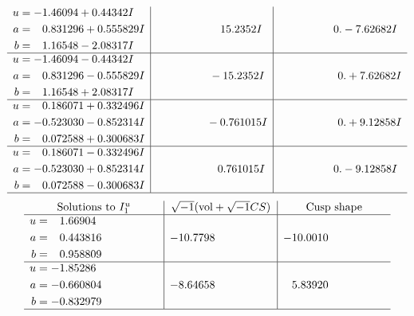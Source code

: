 \documentclass[1p]{elsarticle_modified}
\theoremstyle{definition}
\newcommand{\I}{\sqrt{-1}}
\begin{document}
$$\begin{array}{c|c|c}
\begin{aligned}
u &= -1.46094 + 0.44342 I \\
a &= \phantom{-}0.831296 + 0.555829 I \\
b &= \phantom{-}1.16548 - 2.08317 I\end{aligned}
 & \phantom{-0.000000 -}15.2352 I & \phantom{-0.000000 } 0. - 7.62682 I \\ \hline\begin{aligned}
u &= -1.46094 - 0.44342 I \\
a &= \phantom{-}0.831296 - 0.555829 I \\
b &= \phantom{-}1.16548 + 2.08317 I\end{aligned}
 & \phantom{-0.000000 } -15.2352 I & \phantom{-0.000000 -}0. + 7.62682 I \\ \hline\begin{aligned}
u &= \phantom{-}0.186071 + 0.332496 I \\
a &= -0.523030 - 0.852314 I \\
b &= \phantom{-}0.072588 + 0.300683 I\end{aligned}
 & \phantom{-0.000000 } -0.761015 I & \phantom{-0.000000 -}0. + 9.12858 I \\ \hline\begin{aligned}
u &= \phantom{-}0.186071 - 0.332496 I \\
a &= -0.523030 + 0.852314 I \\
b &= \phantom{-}0.072588 - 0.300683 I\end{aligned}
 & \phantom{-0.000000 -}0.761015 I & \phantom{-0.000000 } 0. - 9.12858 I\\
 \hline 
 \end{array}$$\newpage$$\begin{array}{c|c|c}  
\text{Solutions to }I^u_{1}& \I (\text{vol} + \sqrt{-1}CS) & \text{Cusp shape}\\
 \hline 
\begin{aligned}
u &= \phantom{-}1.66904\phantom{ +0.000000I} \\
a &= \phantom{-}0.443816\phantom{ +0.000000I} \\
b &= \phantom{-}0.958809\phantom{ +0.000000I}\end{aligned}
 & -10.7798\phantom{ +0.000000I} & -10.0010\phantom{ +0.000000I} \\ \hline\begin{aligned}
u &= -1.85286\phantom{ +0.000000I} \\
a &= -0.660804\phantom{ +0.000000I} \\
b &= -0.832979\phantom{ +0.000000I}\end{aligned}
 & -8.64658\phantom{ +0.000000I} & \phantom{-}5.83920\phantom{ +0.000000I}\\
 \hline 
 \end{array}$$\newpage\newpage\renewcommand{\arraystretch}{1}
\end{document}
